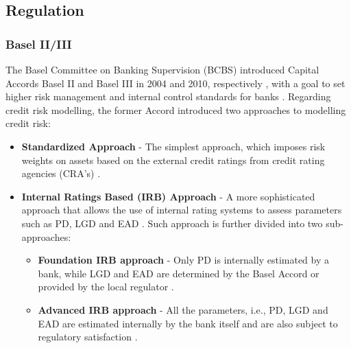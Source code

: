 \subsection{Regulation}
\subsubsection{Basel II/III}
The Basel Committee on Banking Supervision (BCBS) introduced Capital Accords Basel II and Basel III in 2004 and 2010, respectively \citep{shakdwipee2017basel}, with a goal to set higher risk management and internal control standards for banks \citep{witzany2017credit}.
Regarding credit risk modelling, the former Accord introduced two approaches to modelling credit risk:
\begin{itemize}\setlength\itemsep{0em}
     \item \textbf{Standardized Approach} - The simplest approach, which imposes risk weights on assets based on the external credit ratings from credit rating agencies (CRA's) \citep{konno2016alternative}.
     \item \textbf{Internal Ratings Based (IRB) Approach} - A more sophisticated approach that allows the use of internal rating systems to assess parameters such as PD, LGD and EAD \citep{baesens2016credit}. Such approach is further divided into two sub-approaches:
      \begin{itemize}\setlength\itemsep{0em}
         \item \textbf{Foundation IRB approach} - Only PD is internally estimated by a bank, while LGD and EAD are determined by the Basel Accord or provided by the local regulator \citep{baesens2016credit}.
         \item \textbf{Advanced IRB approach} - All the parameters, i.e., PD, LGD and EAD are estimated internally by the bank itself and are also subject to regulatory satisfaction \citep{joseph2013advanced}.
    \end{itemize}
\end{itemize}
